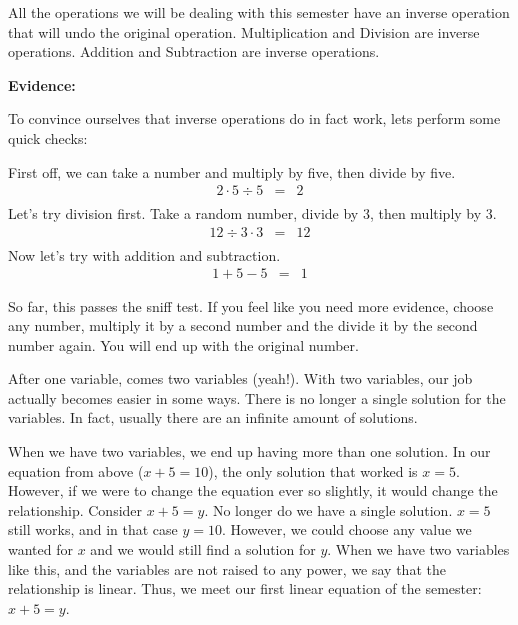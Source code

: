 \begin{theorem}
All the operations we will be dealing with this semester have an inverse operation that will undo the original operation. Multiplication and Division are inverse operations. Addition and Subtraction are inverse operations. 	
\end{theorem}

\noindent
\textbf{Evidence:}

\noindent
To convince ourselves that inverse operations do in fact work, lets perform some quick checks:

\begin{center}
First off, we can take a number and multiply by five, then divide by five.
$$
\begin{array}{rcl}
2 \cdot 5 \div 5 &=& 2\\
\end{array}
$$
Let's try division first. Take a random number, divide by 3, then multiply by 3. 
$$
\begin{array}{rcl}
12 \div 3 \cdot 3 & = & 12 \\ 
\end{array}
$$
Now let's try with addition and subtraction.
$$
\begin{array}{rcl}
1+5 -5 & = & 1
\end{array}
$$
\end{center}

So far, this passes the sniff test. If you feel like you need more evidence, choose any number, multiply it by a second number and the divide it by the second number again. You will end up with the original number. 

After one variable, comes two variables (yeah!). With two variables, our job actually becomes easier in some ways. There is no longer a single solution for the variables. In fact, usually there are an infinite amount of solutions. 

\pagebreak 

\begin{example}
When we have two variables, 	we end up having more than one solution. In our equation from above ($x+5=10$), the only solution that worked is $x=5$. However, if we were to change the equation ever so slightly, it would change the relationship. Consider $x +5 =y$. No longer do we have a single solution. $x=5$ still works, and in that case $y=10$. However, we could choose any value we wanted for $x$ and we would still find a solution for $y$. When we have two variables like this, and the variables are not raised to any power, we say that the relationship is linear. Thus, we meet our first linear equation of the semester: $x+5=y$. 
\end{example}


